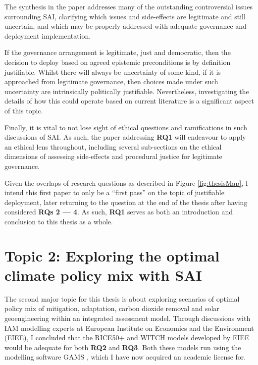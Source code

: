 \documentclass{article}
\begin{document}
The synthesis in the paper addresses many of the outstanding controversial issues surrounding SAI, clarifying which issues and side-effects are legitimate and still uncertain, and which may be properly addressed with adequate governance and deployment implementation. \medskip

If the governance arrangement is legitimate, just and democratic, then the decision to deploy based on agreed epistemic preconditions is by definition justifiable. Whilst there will always be uncertainty of some kind, if it is approached from legitimate governance, then choices made under such uncertainty are intrinsically politically justifiable. Nevertheless, investigating the details of how this could operate based on current literature is a significant aspect of this topic.\medskip

Finally, it is vital to not lose sight of ethical questions and ramifications in such discussions of SAI. As such, the paper addressing \textbf{RQ1} will endeavour to apply an ethical lens throughout, including several sub-sections on the ethical dimensions of assessing side-effects and procedural justice for legitimate governance. \medskip

Given the overlaps of research questions as described in Figure \ref{fig:thesisMap}, I intend this first paper to only be a ``first pass'' on the topic of justifiable deployment, later returning to the question at the end of the thesis after having considered \textbf{RQs 2 --- 4}. As such, \textbf{RQ1} serves as both an introduction and conclusion to this thesis as a whole.
\clearpage
\section*{Topic 2: Exploring the optimal climate policy mix with SAI}
\label{Topic2}

The second major topic for this thesis is about exploring scenarios of optimal policy mix of mitigation, adaptation, carbon dioxide removal and solar geoengineering within an integrated assessment model. Through discussions with IAM modelling experts at European Institute on Economics and the Environment (EIEE), I concluded that the RICE50+ \citep{RICE} and WITCH models \citep{emmerling2016witch} developed by EIEE  would be adequate for both \textbf{RQ2} and \textbf{RQ3}. Both these models run using the modelling software GAMS \citep{GAMS}, which I have now acquired an academic license for.\medskip
\end{document}
